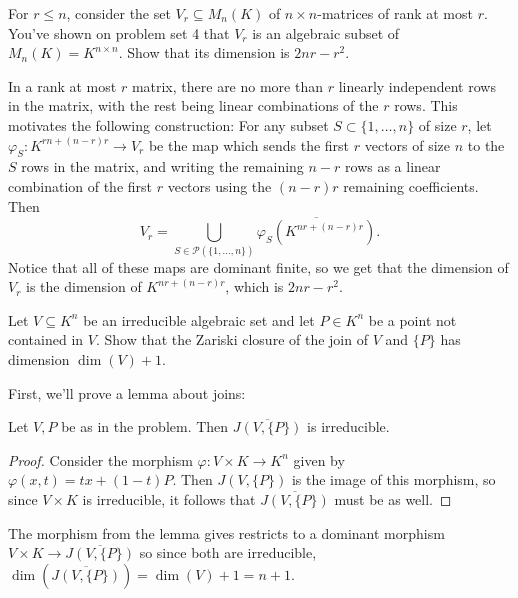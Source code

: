 \documentclass[11pt,letterpaper]{article}
\begin{document}
\begin{problem}
    For $r\leq n$, consider the set $V_r\subseteq M_n(K)$ of $n\times n$-matrices of rank at most $r$. You've shown on problem set 4 that $V_r$ is an algebraic subset of $M_n(K) = K^{n\times n}$. Show that its dimension is $2nr - r^2$.
\end{problem}

\begin{solution}
    In a rank at most $r$ matrix, there are no more than $r$ linearly independent rows in the matrix, with the rest being linear combinations of the $r$ rows. This motivates the following construction: For any subset $S\subset \{1,\ldots, n\}$ of size $r$, let $\varphi_S : K^{rn+(n-r)r} \to V_r$ be the map which sends the first $r$ vectors of size $n$ to the $S$ rows in the matrix, and writing the remaining $n-r$ rows as a linear combination of the first $r$ vectors using the $(n-r)r$ remaining coefficients. Then
    \[
        V_r = \bigcup_{S\in \mathcal{P}(\{1,\ldots,n\})} \overline{\varphi_S(K^{nr+(n-r)r})}
    .\] 
    Notice that all of these maps are dominant finite, so we get that the dimension of $V_r$ is the dimension of $K^{nr+(n-r)r}$, which is $2nr-r^2$.
\end{solution}

\begin{problem}
    Let $V\subseteq K^n$ be an irreducible algebraic set and let $P\in K^n$ be a point not contained in $V$. Show that the Zariski closure of the join of $V$ and $\{P\}$ has dimension $\dim(V)+1$.
\end{problem}

\begin{solution}
    First, we'll prove a lemma about joins:
    \begin{ilemma}
        Let $V,P$ be as in the problem. Then $\overline{J(V,\{P\})}$ is irreducible.
    \end{ilemma}
    \begin{proof}
        Consider the morphism $\varphi : V\times K \to K^n$ given by $\varphi(x, t) = tx + (1-t)P$. Then $J(V,\{P\})$ is the image of this morphism, so since $V\times K$ is irreducible, it follows that $\overline{J(V,\{P\})}$ must be as well.
    \end{proof}
    The morphism from the lemma gives restricts to a dominant morphism $V\times K \to \overline{J(V,\{P\})}$ so since both are irreducible, $\dim(\overline{J(V,\{P\})}) = \dim(V)+1=n+1$.
\end{solution}
\end{document}
